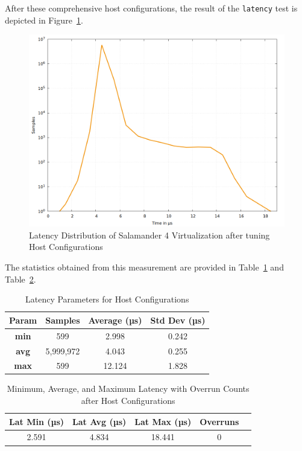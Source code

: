 \documentclass[MMR,Master,english]{style/twbook}
\begin{document}
\clearpage

\noindent After these comprehensive host configurations, the result of the \texttt{latency} test is depicted in Figure~\ref{fig:max_latency_rt_kernelparam_host}.

\begin{figure}[H]
	\centering
	\includegraphics[width=0.7\columnwidth]{img/implementation/gnuplot_max_latency_rt_kernelparam_host.png}
	\caption[Latency Distribution of Salamander 4 after Host Configurations]{Latency Distribution of Salamander 4 Virtualization after tuning Host Configurations}
	\label{fig:max_latency_rt_kernelparam_host}
\end{figure}

\noindent The statistics obtained from this measurement are provided in Table~\ref{tab:latency_stats_virt_host} and Table~\ref{tab:latency_overrun_msw_new_virt_host}.

\begin{table}[H]
	\centering
	\caption{Latency Parameters for Host Configurations}
	\label{tab:latency_stats_virt_host}
	\begin{tabular}{|c|c|c|c|}
		\hline
		\textbf{Param} & \textbf{Samples} & \textbf{Average (µs)} & \textbf{Std Dev (µs)} \\ \hline
		\textbf{min}   & 599              & 2.998                 & 0.242                 \\ \hline
		\textbf{avg}   & 5,999,972        & 4.043                 & 0.255                 \\ \hline
		\textbf{max}   & 599              & 12.124                & 1.828                 \\ \hline
	\end{tabular}
\end{table}

\begin{table}[H]
	\centering
	\caption[Latency Statistics with Overrun Counts after Host Configurations]{Minimum, Average, and Maximum Latency with Overrun Counts after Host Configurations}
	\label{tab:latency_overrun_msw_new_virt_host}
	\begin{tabular}{|c|c|c|c|c|}
		\hline
		\textbf{Lat Min (µs)} & \textbf{Lat Avg (µs)} & \textbf{Lat Max (µs)} & \textbf{Overruns} \\ \hline
		2.591                 & 4.834                 & 18.441                & 0                 \\ \hline
	\end{tabular}
\end{table}
\end{document}
